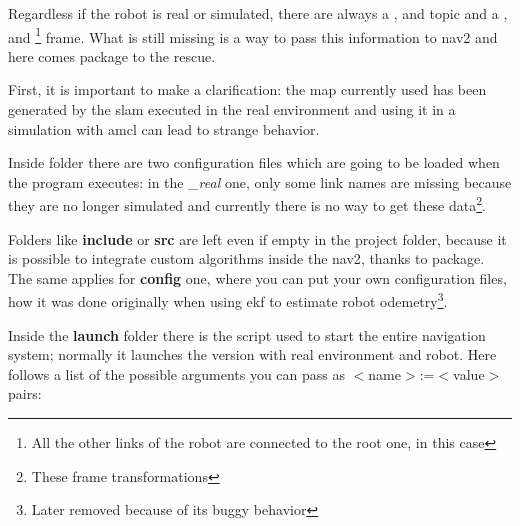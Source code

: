 
Regardless if the robot is real or simulated, there are always a ,  and  topic and a ,  and \footnote{All the other links of the robot are connected to the root one,  in this case} frame. What is still missing is a way to pass this information to \Acrshort{nav2} and here comes  package to the rescue.

First, it is important to make a clarification: the map currently used has been generated by the \Acrshort{slam} executed in the real environment and using it in a simulation with \Acrshort{amcl} can lead to strange behavior.

Inside  folder there are two configuration files which are going to be loaded when the program executes: in the {\it \_real} one, only some link names are missing because they are no longer simulated and currently there is no way to get these data\footnote{These frame transformations}.

Folders like {\bf include} or {\bf src} are left even if empty in the project folder, because it is possible to integrate custom algorithms inside the \Acrlong{nav2}, thanks to  package. The same applies for {\bf config} one, where you can put your own configuration files, how it was done originally when using \Acrfull{ekf} to estimate robot odemetry\footnote{Later removed because of its buggy behavior}.

Inside the {\bf launch} folder there is the script used to start the entire navigation system; normally it launches the version with real environment and robot. Here follows a list of the possible arguments you can pass as $<$name$>$:=$<$value$>$ pairs: %

\newcommand{\arguments}[2]{{\bf #1}: {\it #2}}

